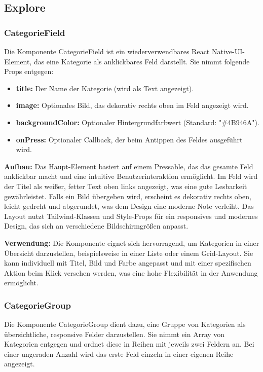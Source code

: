 \documentclass[12pt, a4paper]{report} %
\begin{document}
\subsection{Explore}

\subsubsection{CategorieField}
Die Komponente CategorieField ist ein wiederverwendbares React Native-UI-Element, das eine Kategorie als anklickbares Feld darstellt. Sie nimmt folgende Props entgegen:
\begin{itemize}
    \item \textbf{title:} Der Name der Kategorie (wird als Text angezeigt).
    \item \textbf{image:} Optionales Bild, das dekorativ rechts oben im Feld angezeigt wird.
    \item \textbf{backgroundColor:} Optionaler Hintergrundfarbwert (Standard: "\#4B946A").
    \item \textbf{onPress:} Optionaler Callback, der beim Antippen des Feldes ausgeführt wird.
\end{itemize}

\noindent\textbf{Aufbau:}
Das Haupt-Element basiert auf einem Pressable, das das gesamte Feld anklickbar macht und eine intuitive Benutzerinteraktion ermöglicht. Im Feld wird der Titel als weißer, fetter Text oben links angezeigt, was eine gute Lesbarkeit gewährleistet. Falls ein Bild übergeben wird, erscheint es dekorativ rechts oben, leicht gedreht und abgerundet, was dem Design eine moderne Note verleiht. Das Layout nutzt Tailwind-Klassen und Style-Props für ein responsives und modernes Design, das sich an verschiedene Bildschirmgrößen anpasst.

\noindent\textbf{Verwendung:} Die Komponente eignet sich hervorragend, um Kategorien in einer Übersicht darzustellen, beispielsweise in einer Liste oder einem Grid-Layout. Sie kann individuell mit Titel, Bild und Farbe angepasst und mit einer spezifischen Aktion beim Klick versehen werden, was eine hohe Flexibilität in der Anwendung ermöglicht.

\subsubsection{CategorieGroup}
Die Komponente CategorieGroup dient dazu, eine Gruppe von Kategorien als übersichtliche, responsive Felder darzustellen. Sie nimmt ein Array von Kategorien entgegen und ordnet diese in Reihen mit jeweils zwei Feldern an. Bei einer ungeraden Anzahl wird das erste Feld einzeln in einer eigenen Reihe angezeigt.
\end{document}
